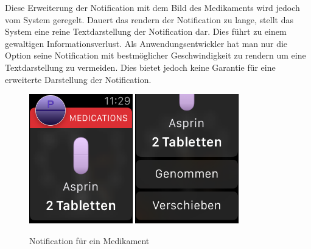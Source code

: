  Diese Erweiterung der Notification mit dem Bild des Medikaments wird jedoch vom System geregelt. Dauert das rendern der Notification zu lange, stellt das System eine reine Textdarstellung der Notification dar. Dies führt zu einem gewaltigen Informationsverlust. Als Anwendungsentwickler hat man nur die Option seine Notification mit bestmöglicher Geschwindigkeit zu rendern um eine Textdarstellung zu vermeiden. Dies bietet jedoch keine Garantie für eine erweiterte Darstellung der Notification.
\begin{figure}
	\caption{Notification für ein Medikament}
	\label{fig:watch-app-notification}
	\centering
	\includegraphics[width=0.4\textwidth]{04_realisation/screenshots/watch/notification01.png}
	\includegraphics[width=0.4\textwidth]{04_realisation/screenshots/watch/notification02.png}
\end{figure}


